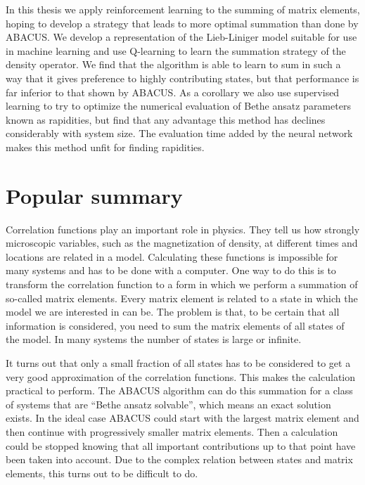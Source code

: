 \documentclass[11pt, a4paper]{report} %
\begin{document}
In this thesis we apply reinforcement learning to the summing of matrix elements, hoping to develop a strategy that leads to more optimal summation than done by ABACUS.\@
We develop a representation of the Lieb-Liniger model suitable for use in machine learning and use Q-learning to learn the summation strategy of the density operator.
We find that the algorithm is able to learn to sum in such a way that it gives preference to highly contributing states, but that performance is far inferior to that shown by ABACUS.\@
As a corollary we also use supervised learning to try to optimize the numerical evaluation of Bethe ansatz parameters known as rapidities, but find that any advantage this method has declines considerably with system size.
The evaluation time added by the neural network makes this method unfit for finding rapidities.

\section*{Popular summary}

Correlation functions play an important role in physics.
They tell us how strongly microscopic variables, such as the magnetization of density, at different times and locations are related in a model.
Calculating these functions is impossible for many systems and has to be done with a computer.
One way to do this is to transform the correlation function to a form in which we perform a summation of so-called matrix elements.
Every matrix element is related to a state in which the model we are interested in can be.
The problem is that, to be certain that all information is considered, you need to sum the matrix elements of all states of the model.
In many systems the number of states is large or infinite.

It turns out that only a small fraction of all states has to be considered to get a very good approximation of the correlation functions.
This makes the calculation practical to perform.
The ABACUS algorithm can do this summation for a class of systems that are ``Bethe ansatz solvable'', which means an exact solution exists.
In the ideal case ABACUS could start with the largest matrix element and then continue with progressively smaller matrix elements.
Then a calculation could be stopped knowing that all important contributions up to that point have been taken into account.
Due to the complex relation between states and matrix elements, this turns out to be difficult to do.
\end{document}
